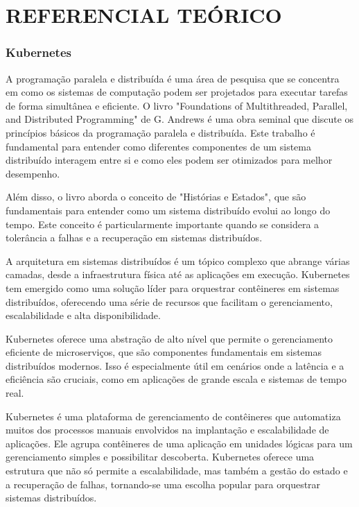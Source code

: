 \chapter{REFERENCIAL TEÓRICO}

\subsection{Kubernetes}

A programação paralela e distribuída é uma área de pesquisa que se concentra em como os sistemas de computação podem ser projetados para executar tarefas de forma simultânea e eficiente. O livro "Foundations of Multithreaded, Parallel, and Distributed Programming" de G. Andrews é uma obra seminal que discute os princípios básicos da programação paralela e distribuída\cite{andrews1999foundations}. Este trabalho é fundamental para entender como diferentes componentes de um sistema distribuído interagem entre si e como eles podem ser otimizados para melhor desempenho.

Além disso, o livro aborda o conceito de "Histórias e Estados", que são fundamentais para entender como um sistema distribuído evolui ao longo do tempo. Este conceito é particularmente importante quando se considera a tolerância a falhas e a recuperação em sistemas distribuídos\cite{andrews1999foundations}.

A arquitetura em sistemas distribuídos é um tópico complexo que abrange várias camadas, desde a infraestrutura física até as aplicações em execução. Kubernetes tem emergido como uma solução líder para orquestrar contêineres em sistemas distribuídos, oferecendo uma série de recursos que facilitam o gerenciamento, escalabilidade e alta disponibilidade\cite{ermolenko2021iot}.

Kubernetes oferece uma abstração de alto nível que permite o gerenciamento eficiente de microserviços, que são componentes fundamentais em sistemas distribuídos modernos. Isso é especialmente útil em cenários onde a latência e a eficiência são cruciais, como em aplicações de grande escala e sistemas de tempo real.

Kubernetes é uma plataforma de gerenciamento de contêineres que automatiza muitos dos processos manuais envolvidos na implantação e escalabilidade de aplicações\cite{ermolenko2021iot}. Ele agrupa contêineres de uma aplicação em unidades lógicas para um gerenciamento simples e possibilitar descoberta\cite{kubernetes2017orchestration}. Kubernetes oferece uma estrutura que não só permite a escalabilidade, mas também a gestão do estado e a recuperação de falhas, tornando-se uma escolha popular para orquestrar sistemas distribuídos.

